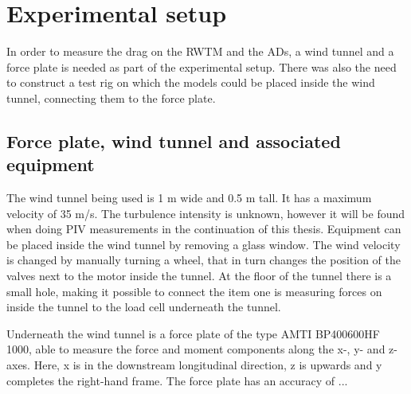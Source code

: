 \section{Experimental setup}

In order to measure the drag on the \gls{RWTM} and the \gls{AD}s, a wind tunnel and a force plate is needed as part of the experimental setup. There was also the need to construct a test rig on which the models could be placed inside the wind tunnel, connecting them to the force plate. 

\subsection{Force plate, wind tunnel and associated equipment}
The wind tunnel being used is 1 \si{\metre} wide and 0.5 m tall. It has a maximum velocity of 35 m/s. The turbulence intensity is unknown, however it will be found when doing \gls{PIV} measurements in the continuation of this thesis. Equipment can be placed inside the wind tunnel by removing a glass window. The wind velocity is changed by manually turning a wheel, that in turn changes the position of the valves next to the motor inside the tunnel. At the floor of the tunnel there is a small hole, making it possible to connect the item one is measuring forces on inside the tunnel to the load cell underneath the tunnel.  


Underneath the wind tunnel is a force plate of the type AMTI BP400600HF 1000, able to measure the force and moment components along the x-, y- and z-axes. Here, x is in the downstream longitudinal direction, z is upwards and y completes the right-hand frame. The force plate has an accuracy of ...  


